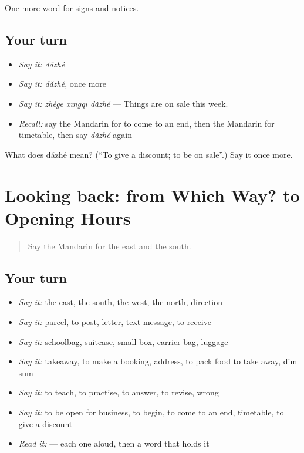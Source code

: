 \begin{grammarlens}[title={What you've built}]
One more word for signs and notices.
\end{grammarlens}

\subsection*{Your turn}
\begin{itemize}
\raggedright
  \item \emph{Say it:} \emph{dǎzhé}
  \item \emph{Say it:} \emph{dǎzhé}, once more
  \item \emph{Say it:} \emph{zhège xīngqī dǎzhé} — Things are on sale this week.
  \item \emph{Recall:} say the Mandarin for to come to an end, then the Mandarin for timetable, then say \emph{dǎzhé} again
\end{itemize}

\begin{tcolorbox}[breakable,colback=teal!4,colframe=teal!35!black,title={Before you move on}]
What does dǎzhé mean? (\textquotedblleft{}To give a discount; to be on sale\textquotedblright{}.) Say it once more.
\end{tcolorbox}
\section[(dialogue)]{Looking back: from Which Way? to Opening Hours}

\label{lesson:ZH-R122-review-117-122}



\begin{quote}
Say the Mandarin for the east and the south.
\end{quote}

\subsection*{Your turn}
\begin{itemize}
\raggedright
  \item \emph{Say it:} the east, the south, the west, the north, direction
  \item \emph{Say it:} parcel, to post, letter, text message, to receive
  \item \emph{Say it:} schoolbag, suitcase, small box, carrier bag, luggage
  \item \emph{Say it:} takeaway, to make a booking, address, to pack food to take away, dim sum
  \item \emph{Say it:} to teach, to practise, to answer, to revise, wrong
  \item \emph{Say it:} to be open for business, to begin, to come to an end, timetable, to give a discount
  \item \emph{Read it:}  — each one aloud, then a word that holds it
\end{itemize}

